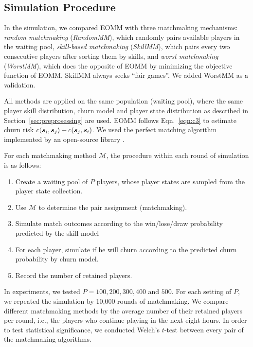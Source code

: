 
\subsection{Simulation Procedure}
In the simulation, we compared EOMM with three matchmaking mechanisms: \textit{random matchmaking} (\textit{RandomMM}), which randomly pairs available players in the waiting pool, \textit{skill-based matchmaking} (\textit{SkillMM}), which pairs every two consecutive players after sorting them by skills, and \textit{worst matchmaking} (\textit{WorstMM}), which does the opposite of EOMM by minimizing the objective function of EOMM. SkillMM always seeks ``fair games''. We added WorstMM as a validation.

All methods are applied on the same population (waiting pool), where the same player skill distribution, churn model and player state distribution as described in Section~\ref{sec:preprosessing} are used. EOMM follows Eqn.~\ref{eqn:c3} to estimate churn risk $c(\boldsymbol{s}_i, \boldsymbol{s}_j) + c(\boldsymbol{s}_j, \boldsymbol{s}_i)$. We used the perfect matching algorithm \cite{gabow1974implementation,lawler2001combinatorial} implemented by an open-source library \cite{onlineperfectmatching}.



For each matchmaking method $\mathcal{M}$, the procedure within each round of simulation is as follows:
\begin{enumerate}
\item Create a waiting pool of $P$ players, whose player states are sampled from the player state collection.
\item Use $\mathcal{M}$ to determine the pair assignment (matchmaking).
\item Simulate match outcomes according to the win/lose/draw probability predicted by the skill model
\item For each player, simulate if he will churn according to the predicted churn probability by churn model.
\item Record the number of retained players.
\end{enumerate}

In experiments, we tested $P=100, 200, 300, 400$ and $500$. For each setting of $P$, we repeated the simulation by 10,000 rounds of matchmaking. We compare different matchmaking methods by the average number of their retained players per round, i.e., the players who continue playing in the next eight hours. In order to test statistical significance, we conducted Welch's $t$-test between every pair of the matchmaking algorithms.

